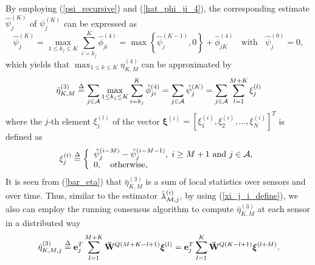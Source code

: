 \documentclass[11pt, draftclsnofoot, onecolumn]{IEEEtran}
\newcommand{\bxi}{{\boldsymbol{\xi}}}
\begin{document}
By employing (\ref{psi_recursive}) and (\ref{hat_phi_ji_4}), the corresponding estimate $\hat \psi _j^{(K)}$ of $\psi _j^{(K)}$ can be expressed as
\begin{equation}
\hat \psi _j^{(K)} = \mathop {\max }\limits_{1 \le {k_j} \le K} \sum\limits_{i = {k_j}}^K {\hat \phi _{ji}^{\left( 4 \right)}}  = \max \left\{ {\hat \psi _j^{(K - 1)},0} \right\} + \hat \phi _{jK}^{\left( 4 \right)} \;\; \text{ with } \;\; \hat \psi _j^{(0)}=0,
\end{equation}
which yields that $ {\max }_{1 \le k \le K} \eta _{K,M}^{(4)}$ can be approximated by
\begin{equation} \label{bar_eta}
\bar \eta _{K,M}^{(3)} \buildrel \Delta \over = \sum\limits_{j \in {\cal A}} {\mathop {\max }\limits_{1 \le {k_j} \le K} \sum\limits_{i = {k_j}}^K {\hat \phi _{ji}^{\left( 4 \right)}} }  = \sum\limits_{j \in {\cal A}} {\hat \psi _j^{(K)}}  = \sum\limits_{j \in {\cal A}} {\sum\limits_{l = 1}^{M+K} {\xi _j^{(l)}} }
\end{equation}
where the $j$-th element $\xi _j^{(l)}$ of the vector ${{{\bxi }}^{(i)}} = {[\xi _1^{(i)},\xi _2^{(i)},...,\xi _N^{(i)}]^T}$ is defined as
\begin{equation} \label{xi_j_i_define}
\xi _j^{(i)} \buildrel \Delta \over = \left\{ \begin{array}{l}
\hat \psi _j^{(i - M)} - \hat \psi _j^{(i - M - 1)}, \; i \ge M + 1 \text{ and } j \in {\cal A}, \\
0, \quad  \text{otherwise},
\end{array} \right.
\end{equation}
It is seen from (\ref{bar_eta}) that $\bar \eta _{K,M}^{(3)}$ is a sum of local statistics over sensors and over time. Thus, similar to the estimator $\hat \lambda _{{\cal M},j}^{(i)}$, by using (\ref{xi_j_i_define}), we also can employ the running consensus algorithm to compute $\bar \eta _{K,M}^{(3)}$ at each sensor in a distributed way 
\begin{equation} \label{hat_eat_3_define}
\hat \eta _{K,M,j}^{(3)} \buildrel \Delta \over = {\bf{e}}_j^T\sum\limits_{l = 1}^{M+K} {{{{\bf{\bar W}}}^{Q\left( {M+ K - l + 1} \right)}}{{\boldsymbol{\xi }}^{(l)}}} = {\bf{e}}_j^T\sum\limits_{l = 1}^{K} {{{{\bf{\bar W}}}^{Q\left( {K - l + 1} \right)}}{{\boldsymbol{\xi }}^{(l+M)}}}.
\end{equation}
\end{document}
